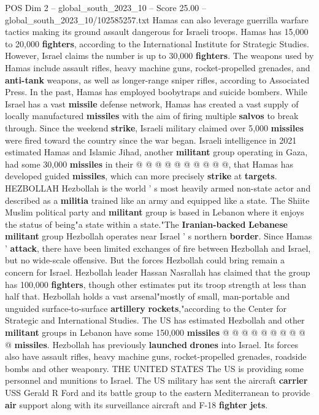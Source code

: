 \begin{textsample}{POS Dim 2 – global\_south\_2023\_10 – Score 25.00 – global\_south\_2023\_10/102585257.txt}
Hamas can also leverage guerrilla warfare tactics making its ground assault dangerous for Israeli troops.
Hamas has 15,000 to 20,000 \textbf{fighters}, according to the International Institute for Strategic Studies.
However, Israel claims the number is up to 30,000 \textbf{fighters}.
The weapons used by Hamas include assault rifles, heavy machine guns, rocket-propelled grenades, and \textbf{anti-tank} weapons, as well as longer-range sniper rifles, according to Associated Press.
In the past, Hamas has employed boobytraps and suicide bombers.
While Israel has a vast \textbf{missile} defense network, Hamas has created a vast supply of locally manufactured \textbf{missiles} with the aim of firing multiple \textbf{salvos} to break through.
Since the weekend \textbf{strike}, Israeli military claimed over 5,000 \textbf{missiles} were fired toward the country since the war began.
Israeli intelligence in 2021 estimated Hamas and Islamic Jihad, another \textbf{militant} group operating in Gaza, had some 30,000 \textbf{missiles} in their @ @ @ @ @ @ @ @ @ @, that Hamas has developed guided \textbf{missiles}, which can more precisely \textbf{strike} at \textbf{targets}.
HEZBOLLAH Hezbollah is the world ' s most heavily armed non-state actor and described as a \textbf{militia} trained like an army and equipped like a state.
The Shiite Muslim political party and \textbf{militant} group is based in Lebanon where it enjoys the status of being"a state within a state."The \textbf{Iranian-backed} \textbf{Lebanese} \textbf{militant} group Hezbollah operates near Israel ' s northern \textbf{border}.
Since Hamas ' \textbf{attack}, there have been limited exchanges of fire between Hezbollah and Israel, but no wide-scale offensive.
But the forces Hezbollah could bring remain a concern for Israel.
Hezbollah leader Hassan Nasrallah has claimed that the group has 100,000 \textbf{fighters}, though other estimates put its troop strength at less than half that.
Hezbollah holds a vast arsenal"mostly of small, man-portable and unguided surface-to-surface \textbf{artillery} \textbf{rockets},"according to the Center for Strategic and International Studies.
The US has estimated Hezbollah and other \textbf{militant} groups in Lebanon have some 150,000 \textbf{missiles} @ @ @ @ @ @ @ @ @ @ \textbf{missiles}.
Hezbollah has previously \textbf{launched} \textbf{drones} into Israel.
Its forces also have assault rifles, heavy machine guns, rocket-propelled grenades, roadside bombs and other weaponry.
THE UNITED STATES The US is providing some personnel and munitions to Israel.
The US military has sent the aircraft \textbf{carrier} USS Gerald R Ford and its battle group to the eastern Mediterranean to provide \textbf{air} support along with its surveillance aircraft and F-18 \textbf{fighter} \textbf{jets}.

\end{textsample}
